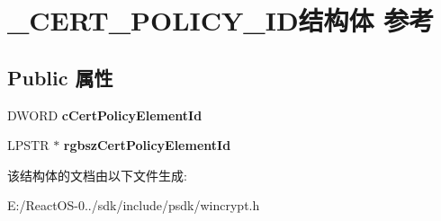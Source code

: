 \hypertarget{struct___c_e_r_t___p_o_l_i_c_y___i_d}{}\section{\+\_\+\+C\+E\+R\+T\+\_\+\+P\+O\+L\+I\+C\+Y\+\_\+\+I\+D结构体 参考}
\label{struct___c_e_r_t___p_o_l_i_c_y___i_d}
\subsection*{Public 属性}
\begin{DoxyCompactItemize}
\item 
\mbox{\label{struct___c_e_r_t___p_o_l_i_c_y___i_d_a602b9d78edd79f8d01c87318908a023c}} 
D\+W\+O\+RD {\bfseries c\+Cert\+Policy\+Element\+Id}
\item 
\mbox{\label{struct___c_e_r_t___p_o_l_i_c_y___i_d_ae191429bea1028e8ada3ec9874b5b2ca}} 
L\+P\+S\+TR $\ast$ {\bfseries rgbsz\+Cert\+Policy\+Element\+Id}
\end{DoxyCompactItemize}


该结构体的文档由以下文件生成\+:\begin{DoxyCompactItemize}
\item 
E\+:/\+React\+O\+S-\/0../sdk/include/psdk/wincrypt.\+h\end{DoxyCompactItemize}

